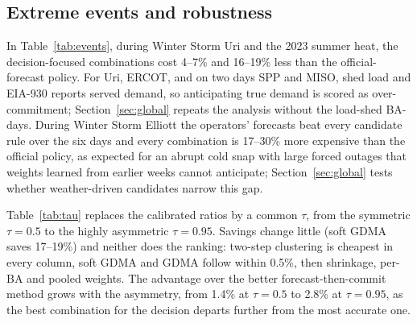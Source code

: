 \subsection{Extreme events and robustness}\label{sec:robust}

\begin{table}[t]
\centering
\caption{System cost during extreme events relative to the official-forecast policy ($W=28$): Winter Storm Uri (10--20 February 2021), Winter Storm Elliott (21--26 December 2022) and the summer heat of 15 July--15 August 2023. Lower is better: values below 1 mean a lower cost than the benchmark.}\label{tab:events}
\small

\end{table}

In Table~\ref{tab:events}, during Winter Storm Uri and the 2023 summer heat, the decision-focused combinations cost 4--7\% and 16--19\% less than the official-forecast policy.
For Uri, ERCOT, and on two days SPP and MISO, shed load \citep{FERCNERC2021} and EIA-930 reports served demand, so anticipating true demand is scored as over-commitment; Section~\ref{sec:global} repeats the analysis without the load-shed BA-days.
During Winter Storm Elliott the operators' forecasts beat every candidate rule over the six days and every combination is 17--30\% more expensive than the official policy, as expected for an abrupt cold snap with large forced outages \citep{FERCNERC2023} that weights learned from earlier weeks cannot anticipate; Section~\ref{sec:global} tests whether weather-driven candidates narrow this gap.

\begin{table}[t]
\centering
\caption{Sensitivity to the cost asymmetry ($W=28$): system cost relative to the official-forecast policy when every BA has the same critical ratio $\tau$, and under the calibrated heterogeneous ratios. Lower is better: values below 1 mean a lower cost than the benchmark.}\label{tab:tau}
\small

\end{table}

Table~\ref{tab:tau} replaces the calibrated ratios by a common $\tau$, from the symmetric $\tau=0.5$ to the highly asymmetric $\tau=0.95$.
Savings change little (soft GDMA saves 17--19\%) and neither does the ranking: two-step clustering is cheapest in every column, soft GDMA and GDMA follow within 0.5\%, then shrinkage, per-BA and pooled weights.
The advantage over the better forecast-then-commit method grows with the asymmetry, from 1.4\% at $\tau=0.5$ to 2.8\% at $\tau=0.95$, as the best combination for the decision departs further from the most accurate one.
